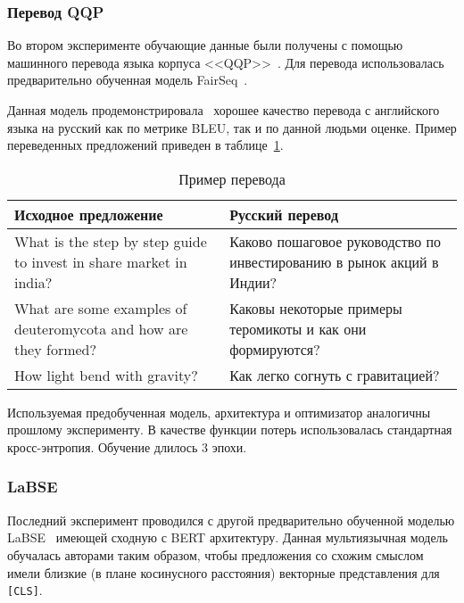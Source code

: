 \documentclass[a4paper,14pt]{extarticle}
\newcommand{\nocontentsline}[3]{}
\newcommand{\tocless}[2]{\bgroup\let\addcontentsline=\nocontentsline#1{#2}\egroup}
\begin{document}
\tocless\subsubsection{Перевод QQP}\label{sssec:transl_qqp}
    Во втором эксперименте обучающие данные были получены с помощью машинного перевода языка корпуса \mbox{<<QQP>>}~\autocite{iyer_csernai_dandekar_2017}.
    Для перевода использовалась предварительно обученная модель \mbox{FairSeq}~\autocite{ng2019facebook}.
    
    Данная модель продемонстрировала~\autocite{wmt19findings} хорошее качество перевода с английского языка на русский как по метрике \mbox{BLEU}, так и по данной людьми оценке. Пример переведенных предложений приведен в таблице~\ref{table:qqp_tr_ex}.
    \begin{table}[htbp]
        \caption{Пример перевода}
        \label{table:qqp_tr_ex}
        \footnotesize
        \centering
        \begin{tabular}{ | p{8cm} | p{8cm} |}
            \hline
            \textbf{Исходное предложение} & \textbf{Русский перевод}\\
            \hline
            What is the step by step guide to invest in share market in india?
            &
            Каково пошаговое руководство по инвестированию в рынок акций в Индии?\\
            \hline
            What are some examples of deuteromycota and how are they formed?
            &
            Каковы некоторые примеры теромикоты и как они формируются?\\
            \hline
            How light bend with gravity?
            &
            Как легко согнуть с гравитацией?\\
            \hline
        \end{tabular}
    \end{table}
    
    Используемая предобученная модель, архитектура и оптимизатор аналогичны прошлому эксперименту.
    В качестве функции потерь использовалась стандартная кросс-энтропия.
    Обучение длилось $3$ эпохи.
\tocless\subsubsection{LaBSE}\label{sssec:labse_qqp}
    Последний эксперимент проводился с другой предварительно обученной моделью \mbox{LaBSE}~\autocite{feng2020language} имеющей сходную с \mbox{BERT} архитектуру.
    Данная мультиязычная модель обучалась авторами таким образом, чтобы предложения со схожим смыслом имели близкие (в плане косинусного расстояния) векторные представления для \texttt{[CLS]}.
    
\end{document}
